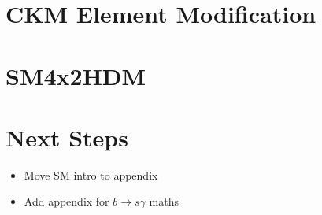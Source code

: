 \documentclass[a4paper,12pt]{article}
\begin{document}
\section{CKM Element Modification}

\section{SM4x2HDM}

\section{Next Steps}
\begin{itemize}
    \item Move SM intro to appendix
    \item Add appendix for $b\to s\gamma$ maths
\end{itemize}
\end{document}
